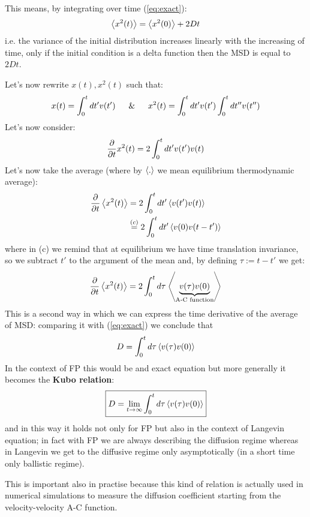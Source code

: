 \documentclass[\main/main.tex]{subfiles}
\begin{document}
This means, by integrating over time (\ref{eq:exact}):
\begin{eqnarray}
    \left\langle x^2(t) \right\rangle=\left\langle x^2(0) \right\rangle+2Dt
\end{eqnarray}
i.e. the variance of the initial distribution increases linearly with the increasing of time, only if the initial condition is a delta function then the MSD is equal to $2Dt$.

Let's now rewrite $x(t),x^2(t)$ such that:
\begin{eqnarray}
x(t)=\int_0^{t}dt'v(t') \quad \And \quad x^2(t)=\int_0^{t}dt' v(t')\int_0^{t}dt''v(t'')
\end{eqnarray}
Let's now consider:
\begin{eqnarray}
\frac{\partial}{\partial t}x^2(t)=2\int_0^{t}dt'v(t')v(t)
\end{eqnarray}
Let's now take the average (where by $\left\langle . \right\rangle$ we mean equilibrium thermodynamic average):
\begin{align}
\frac{\partial}{\partial t}\left\langle x^{2}(t) \right\rangle&=2\int_0^{t}dt'\left\langle v(t')v(t) \right\rangle \\
&\overset{(c)}{=}2\int_0^t dt'\left\langle v(0)v(t-t') \right\rangle
\end{align}
where in (c) we remind that at equilibrium we have time translation invariance, so we subtract $t'$ to the argument of the mean and, by defining $\tau:=t-t'$ we get:
\begin{eqnarray}
\frac{\partial}{\partial t}\left\langle x^2(t) \right\rangle=2\int_0^t d\tau\left\langle \underbrace{v(\tau)v(0)}_{\text{A-C function}} \right\rangle
\end{eqnarray}
This is a second way in which we can express the time derivative of the average of MSD: comparing it with (\ref{eq:exact}) we conclude that
\begin{eqnarray}
D=\int_0 ^t d\tau\left\langle v(\tau)v(0) \right\rangle
\end{eqnarray}
In the context of FP this would be and exact equation but more generally it becomes the \textbf{Kubo relation}:
\begin{eqnarray}
\boxed{D=\lim_{t\to\infty}\int_0 ^t d\tau\left\langle v(\tau)v(0) \right\rangle}
\end{eqnarray}
and in this way it holds not only for FP but also in the context of Langevin equation; in fact with FP
we are always describing the diffusion regime whereas in Langevin we get to the diffusive regime only asymptotically (in a short time only ballistic regime).

This is important also in practise because this kind of relation is actually used in numerical simulations to measure the diffusion coefficient starting from the velocity-velocity A-C function. \\
\end{document}
